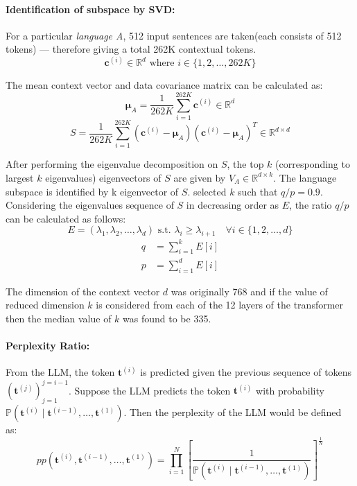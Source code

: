 \paragraph{Identification of subspace by SVD:} For a particular \emph{language A}, 512 input sentences are taken(each consists of 512 tokens) --- therefore giving a total 262K contextual tokens.
\begin{equation}
	\mathbf{c}^{(i)} \in \mathbb{R}^d \text{ where } i \in \{1, 2, \dots , 262K\}
\end{equation}

The mean context vector and data covariance matrix can be calculated as:
\begin{equation}
	\bm{\mu}_A = \frac{1}{262K}\sum_{i=1}^{262K} \mathbf{c}^{(i)} \in \mathbb{R}^d
\end{equation}
\begin{equation}
	S = \frac{1}{262K} \sum_{i = 1}^{262K} (\mathbf{c}^{(i)} - \bm{\mu}_A)(\mathbf{c}^{(i)} - \bm{\mu}_A)^T \in \mathbb{R}^{d \times d}
\end{equation}

After performing the eigenvalue decomposition on $S$, the top $k$ (corresponding to largest $k$ eigenvalues) eigenvectors of $S$ are given by $V_A \in \mathbb{R}^{d \times k}$. The language subspace is identified by k eigenvector of $S$. \citet{chang2022geometry} selected $k$ such that $q/p = 0.9$. Considering the eigenvalues sequence of $S$ in decreasing order as $E$, the ratio $q/p$ can be calculated as follows:
\begin{equation}
	E = (\lambda_1, \lambda_2, \dots , \lambda_d) \text{ s.t. } \lambda_i \ge \lambda_{i+1} \quad \forall i \in \{1,2, \dots, d\}
\end{equation}
\begin{align}
	q &= \sum_{i = 1}^{k} E[i]\\
	p &= \sum_{i=1}^{d} E[i]
\end{align}

The dimension of the context vector $d$ was originally 768 and if the value of reduced dimension $k$ is considered from each of the 12 layers of the transformer then the median value of $k$ was found to be 335.

\paragraph{Perplexity Ratio:} From the LLM, the token $\mathbf{t}^{(i)}$ is predicted given the previous sequence of tokens $(\mathbf{t}^{(j)})_{j = 1}^{j = i-1}$. Suppose the LLM predicts the token $\mathbf{t}^{(i)}$ with probability $\mathbb{P}(\mathbf{t}^{(i)} \mid \mathbf{t}^{(i-1)}, \dots , \mathbf{t}^{(1)})$. Then the perplexity of the LLM would be defined as:
\begin{equation}\label{E:pp}
	pp(\mathbf{t}^{(i)}, \mathbf{t}^{(i-1)}, \dots , \mathbf{t}^{(1)}) = \prod_{i = 1}^{N} \left[ \frac{1}{\mathbb{P}(\mathbf{t}^{(i)} \mid \mathbf{t}^{(i-1)}, \dots , \mathbf{t}^{(1)})} \right]^{\frac{1}{N}}
\end{equation}

